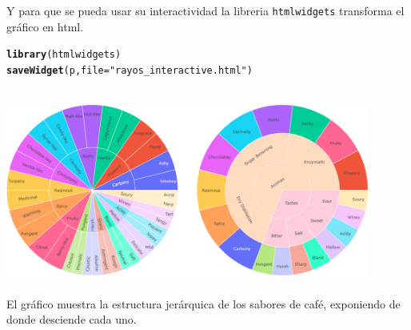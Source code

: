 \documentclass{article}\usepackage[]{graphicx}\usepackage[]{color}
\makeatletter
\newcommand{\hlstr}[1]{\textcolor[rgb]{0.192,0.494,0.8}{#1}}%
\newcommand{\hlstd}[1]{\textcolor[rgb]{0.345,0.345,0.345}{#1}}%
\newcommand{\hlkwc}[1]{\textcolor[rgb]{0.333,0.667,0.333}{#1}}%
\newcommand{\hlkwd}[1]{\textcolor[rgb]{0.737,0.353,0.396}{\textbf{#1}}}%
\newenvironment{kframe}{%
 \def\at@end@of@kframe{}%
 \ifinner\ifhmode%
  \def\at@end@of@kframe{\end{minipage}}%
  \begin{minipage}{\columnwidth}%
 \fi\fi%
 \def\FrameCommand##1{\hskip\@totalleftmargin \hskip-\fboxsep
 \colorbox{shadecolor}{##1}\hskip-\fboxsep
     \hskip-\linewidth \hskip-\@totalleftmargin \hskip\columnwidth}%
 \MakeFramed {\advance\hsize-\width
   \@totalleftmargin\z@ \linewidth\hsize
   \@setminipage}}%
 {\par\unskip\endMakeFramed%
 \at@end@of@kframe}
\newenvironment{knitrout}{}{} %
\makeatother
\begin{document}
Y para que se pueda usar su interactividad la libreria \texttt{htmlwidgets} transforma el gr\'afico en html.
\begin{knitrout}
\color{fgcolor}\begin{kframe}
\begin{alltt}
\hlkwd{library}\hlstd{(htmlwidgets)}
\hlkwd{saveWidget}\hlstd{(p,} \hlkwc{file} \hlstd{=} \hlstr{"rayos_interactive.html"}\hlstd{)}
\end{alltt}
\end{kframe}
\end{knitrout}
~\\
\vbox{
    \centering
    \includegraphics[width=0.9\textwidth]{imag/rayos_interactive}
}~\\~\\
El gr\'afico muestra la estructura jer\'arquica de los sabores de caf\'e, exponiendo de donde desciende cada uno.
\clearpage
\end{document}
